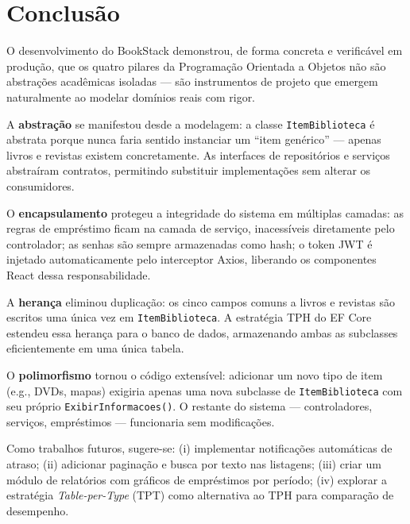 \documentclass[
  12pt,
  a4paper,
  oneside,
  brazil
]{abntex2}
\begin{document}
\chapter{Conclusão}
\label{cap:conclusao}

O desenvolvimento do BookStack demonstrou, de forma concreta e verificável em produção, que os quatro pilares da Programação Orientada a Objetos não são abstrações acadêmicas isoladas — são instrumentos de projeto que emergem naturalmente ao modelar domínios reais com rigor.

A \textbf{abstração} se manifestou desde a modelagem: a classe \texttt{ItemBiblioteca} é abstrata porque nunca faria sentido instanciar um ``item genérico'' — apenas livros e revistas existem concretamente. As interfaces de repositórios e serviços abstraíram contratos, permitindo substituir implementações sem alterar os consumidores.

O \textbf{encapsulamento} protegeu a integridade do sistema em múltiplas camadas: as regras de empréstimo ficam na camada de serviço, inacessíveis diretamente pelo controlador; as senhas são sempre armazenadas como hash; o token JWT é injetado automaticamente pelo interceptor Axios, liberando os componentes React dessa responsabilidade.

A \textbf{herança} eliminou duplicação: os cinco campos comuns a livros e revistas são escritos uma única vez em \texttt{ItemBiblioteca}. A estratégia TPH do EF Core estendeu essa herança para o banco de dados, armazenando ambas as subclasses eficientemente em uma única tabela.

O \textbf{polimorfismo} tornou o código extensível: adicionar um novo tipo de item (e.g., DVDs, mapas) exigiria apenas uma nova subclasse de \texttt{ItemBiblioteca} com seu próprio \texttt{ExibirInformacoes()}. O restante do sistema — controladores, serviços, empréstimos — funcionaria sem modificações.

Como trabalhos futuros, sugere-se: (i) implementar notificações automáticas de atraso; (ii) adicionar paginação e busca por texto nas listagens; (iii) criar um módulo de relatórios com gráficos de empréstimos por período; (iv) explorar a estratégia \textit{Table-per-Type} (TPT) como alternativa ao TPH para comparação de desempenho.

\postextual


\end{document}
